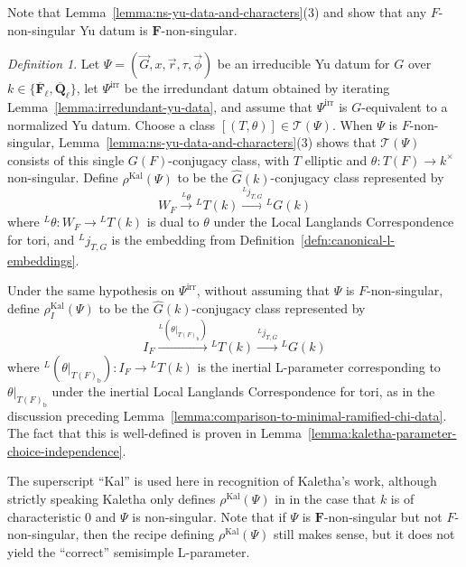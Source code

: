 \documentclass[reqno]{amsart}
\numberwithin{equation}{subsection}
\newcommand{\F}{\mathbf{F}}
\newcommand{\Q}{\mathbf{Q}}
\newcommand{\ol}[1]{\overline{#1}}
\newcommand{\wh}[1]{\widehat{#1}}
\newcommand{\co}{\colon}
\newcommand{\ld}{{}^L}
\newcommand\cT{\mathcal{T}}
\DeclareMathOperator{\Kal}{Kal}
\theoremstyle{remark}
\newtheorem{defn}[thm]{Definition}
\numberwithin{equation}{subsection}
\numberwithin{figure}{subsection}
\begin{document}
Note that Lemma~\ref{lemma:ns-yu-data-and-characters}(3) and \cite[Fact 3.1.4(1)]{Kal21b} show that any $F$-non-singular Yu datum is $\F$-non-singular.

\begin{defn}\label{def:expected-L-param}
Let $\Psi=(\vec G,x,\vec r,\tau,\vec\phi)$ be an irreducible Yu datum for $G$ over $k\in\{\ol\F_\ell,\ol\Q_\ell\}$, let $\Psi^{\mathrm{irr}}$ be the irredundant datum obtained by iterating Lemma~\ref{lemma:irredundant-yu-data}, and assume that $\Psi^{\mathrm{irr}}$ is $G$-equivalent to a normalized Yu datum. Choose a class $[(T,\theta)]\in\cT(\Psi)$. When $\Psi$ is $F$-non-singular, Lemma~\ref{lemma:ns-yu-data-and-characters}(3) shows that $\cT(\Psi)$ consists of this single $G(F)$-conjugacy class, with $T$ elliptic and $\theta\colon T(F)\to k^\times$ non-singular. Define $\rho^{\Kal}(\Psi)$ to be the $\wh G(k)$-conjugacy class represented by
\begin{equation}\label{eq:nonsingular-Kal-param}
W_F \xrightarrow{\ld \theta} \ld T(k) \xrightarrow{ \ld j_{T,G}} \ld G(k)
\end{equation}
where $\ld\theta\co W_F\to\ld T(k)$ is dual to $\theta$ under the Local Langlands Correspondence for tori, and $\ld j_{T,G}$ is the embedding from Definition~\ref{defn:canonical-l-embeddings}.

Under the same hypothesis on $\Psi^{\mathrm{irr}}$, without assuming that $\Psi$ is $F$-non-singular, define $\rho_I^{\Kal}(\Psi)$ to be the $\wh G(k)$-conjugacy class represented by
\begin{equation}\label{eq:inertial-Kal-param}
I_F \xrightarrow{\ld(\theta|_{T(F)_{\mathrm b}})} \ld T(k) \xrightarrow{ \ld j_{T,G}} \ld G(k)
\end{equation}
where $\ld(\theta|_{T(F)_{\mathrm b}})\co I_F\to\ld T(k)$ is the inertial L-parameter corresponding to $\theta|_{T(F)_{\mathrm{b}}}$ under the inertial Local Langlands Correspondence for tori, as in the discussion preceding Lemma~\ref{lemma:comparison-to-minimal-ramified-chi-data}. The fact that this is well-defined is proven in Lemma~\ref{lemma:kaletha-parameter-choice-independence}.
\end{defn}


The superscript ``Kal'' is used here in recognition of Kaletha's work, although strictly speaking Kaletha only defines $\rho^{\Kal}(\Psi)$ in \cite{Kal21b} in the case that $k$ is of characteristic $0$ and $\Psi$ is non-singular. Note that if $\Psi$ is $\F$-non-singular but not $F$-non-singular, then the recipe defining $\rho^{\Kal}(\Psi)$ still makes sense, but it does not yield the ``correct'' semisimple L-parameter.
\end{document}
